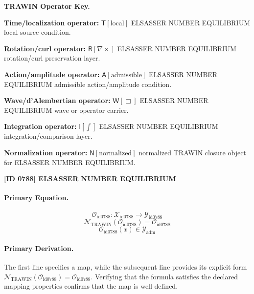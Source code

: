 \par\vspace{0.45\baselineskip}
\noindent\begin{minipage}[t]{\linewidth}
\begingroup
\small
\raggedright
\textbf{TRAWIN Operator Key.}\par
\noindent\textbf{Time/localization operator:} $\mathsf{T}\!\left[\mathrm{local}\right]$ ELSASSER NUMBER EQUILIBRIUM local source condition.\par
\noindent\textbf{Rotation/curl operator:} $\mathsf{R}\!\left[\nabla\times\right]$ ELSASSER NUMBER EQUILIBRIUM rotation/curl preservation layer.\par
\noindent\textbf{Action/amplitude operator:} $\mathsf{A}\!\left[\mathrm{admissible}\right]$ ELSASSER NUMBER EQUILIBRIUM admissible action/amplitude condition.\par
\noindent\textbf{Wave/d'Alembertian operator:} $\mathsf{W}\!\left[\Box\right]$ ELSASSER NUMBER EQUILIBRIUM wave or operator carrier.\par
\noindent\textbf{Integration operator:} $\mathsf{I}\!\left[\int\right]$ ELSASSER NUMBER EQUILIBRIUM integration/comparison layer.\par
\noindent\textbf{Normalization operator:} $\mathsf{N}\!\left[\mathrm{normalized}\right]$ normalized TRAWIN closure object for ELSASSER NUMBER EQUILIBRIUM.\par
\endgroup
\end{minipage}

\clearpage
\noindent\textbf{[ID 0788] ELSASSER NUMBER EQUILIBRIUM}\par
\vspace{0.35em}
\paragraph{Primary Equation.}
\[
\mathcal{O}_{\mathrm{id0788}}:\mathcal{X}_{\mathrm{id0788}}\longrightarrow\mathcal{Y}_{\mathrm{id0788}}
\]
\[
\mathcal{N}_{\mathrm{TRAWIN}}(\mathcal{O}_{\mathrm{id0788}})=\mathcal{O}_{\mathrm{id0788}}
\]
\[
\mathcal{O}_{\mathrm{id0788}}(x)\in\mathcal{Y}_{\mathrm{adm}}
\]

\paragraph{Primary Derivation.}
The first line specifies a map, while the subsequent line provides its explicit form \( \mathcal{N}_{\mathrm{TRAWIN}}(\mathcal{O}_{\mathrm{id0788}})=\mathcal{O}_{\mathrm{id0788}} \). Verifying that the formula satisfies the declared mapping properties confirms that the map is well defined.
